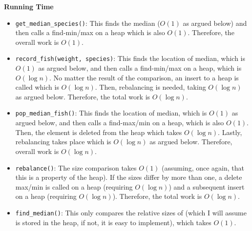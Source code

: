 \documentclass[12pt,twoside]{article}
\begin{document}
\begin{problems}
\begin{problemparts}
    \smallbreak

    {\bf Running Time}
    \begin{itemize}
        \item {\tt get\_median\_species()}: This finds the median ($O(1)$ as
        argued below) and then calls a find-min/max on a heap which is also $
        O(1) $. Therefore, the overall work is $ O(1) $.
        \item {\tt record\_fish(weight, species)}: This finds the location of
        median, which is $ O(1) $ as argued below, and then calls a
        find-min/max on a heap, which is $ O(\log n) $. No matter the result
        of the comparison, an insert to a heap is called which is $ O(\log n) $.
        Then, rebalancing is needed, taking $ O(\log n) $ as argued below.
        Therefore, the total work is $ O(\log n ) $.
        \item {\tt pop\_median\_fish()}: This finds the location of median,
        which is $ O(1) $ as argued below, and then calls a find-max/min on a
        heap, which is also $ O(1) $. Then, the element is deleted from the
        heap which takes $ O(\log n) $. Lastly, rebalancing takes place which
        is $ O(\log n) $ as argued below. Therefore, overall work is $ O(\log
        n) $.
        \item {\tt rebalance()}: The size comparison takes $ O(1) $
        (assuming, once again, that this is a property of the heap). If the
        sizes differ by more than one, a delete max/min is called on a heap
        (requiring $ O(\log n) $) and a subsequent insert on a heap
        (requiring $ O(\log n) $). Therefore, the total work is $ O(\log n) $.
        \item {\tt find\_median()}: This only compares the relative sizes of
        (which I will assume is stored in the heap, if not, it is easy to
        implement), which takes $ O(1) $.
    \end{itemize}


\end{problemparts}
\end{problems}
\end{document}
